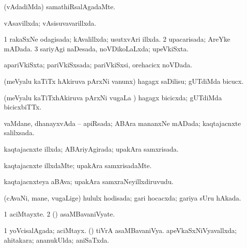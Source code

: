 {{\bentry
{} 
\gl{\nA}
\expl{}
\bmng
{} 
\emng
\eentry

\bentry
{} 
\gl{\kirxvi}
\expl{}
\bmng
(vAdadiMda) samathiRsalAgadaMte. 
\emng
\eentry

\bentry
{} 
\gl{\gu}
\expl{}
\bmng
vAsavillxda; vAsisuvavarillxda. 
\emng
\eentry

\bentry
{} 
\gl{\gu}
\expl{}
\bmng
\bnum
\num{1} rakaSxNe odagisada; kAvalillxda; usutxvAri illxda. 
\num{2} upacarisada; AreYke mADada. 
\num{3} sariyAgi naDesada, noVDikoLaLxda; upeVkiSxta. 
\enum
\emng
\eentry

\bentry
{} 
\gl{\gu}
\expl{}
\bmng
apariVkiSxta; pariVkiSxsada; pariVkiSxsi, orehacicx noVDada. 
\emng
\eentry

\bentry
{} 
\gl{\sakirx}
\expl{}
\bmng
(meVyalu kaTiTx hAkiruva pArxNi \mo vanunx) hagagx saDilisu; gUTdiMda bicucx. 
\emng
\eentry

\bentry
{} 
\gl{\gu}
\expl{}
\bmng
(meVyalu kaTiTxhAkiruva pArxNi \mo vugaLa \vi) hagagx bicicxda; gUTdiMda bicicxbiTTx. 
\emng
\eentry

\bentry
{} 
\gl{\gu}
\expl{}
\bmng
vaMdane, dhanayxvAda -- apiRsada; ABAra mananxNe mADada; kaqtajacnxte salilxsada. 
\emng
\eentry

\bentry
{} 
\gl{\gu}
\expl{}
\bmng
kaqtajacnxte illxda; ABAriyAgirada; upakAra samxrisada. 
\emng
\eentry

\bentry
{} 
\gl{\kirxvi}
\expl{}
\bmng
kaqtajacnxte illxdaMte; upakAra samxrisadaMte. 
\emng
\eentry

\bentry
{} 
\gl{\nA}
\expl{}
\bmng
kaqtajacnxteya aBAva; upakAra samxraNeyillxdiruvudu. 
\emng
\eentry

\bentry
{} 
\gl{\gu}
\expl{}
\bmng
(cAvaNi, mane, \mo vugaLige) hululx hodisada; gari hocacxda; gariya sUru hAkada. 
\emng
\eentry

\bentry
{} 
\gl{\nA}
\expl{}
\bmng
\bnum
\num{1} aciMtayxte. 
\num{2} (\AmA) asaMBavaniVyate. 
\enum
\emng
\eentry

\bentry
{} 
\gl{\gu}
\expl{}
\bmng
\bnum
\num{1} yoVcisalAgada; aciMtayx. 
 (\AmA) 
\banum
{} tiVrA asaMBavaniVya. 
 apeVkaSxNiVyavallxda; ahitakara; ananukUlda; aniSaTxda. 
\eanum
\numie
\enum
\emng
\eentry

}}
